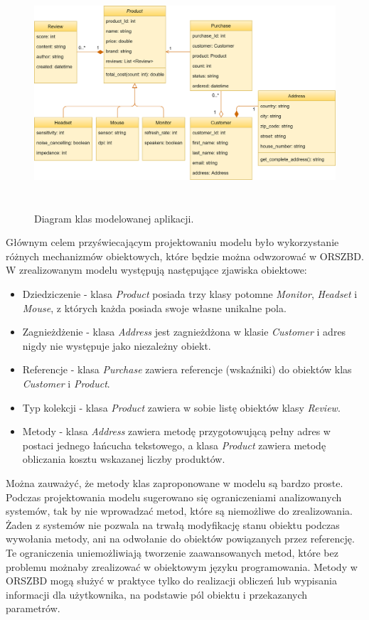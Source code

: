 \documentclass[a4paper,twoside,12pt]{book}
\begin{document}
\begin{figure}[!h]
    \centering
    \includegraphics[height=8.6cm]{images/d1.png}
    \caption{Diagram klas modelowanej aplikacji.}
    \label{fig:diagram-klas}
\end{figure}

Głównym celem przyświecającym projektowaniu modelu było wykorzystanie różnych mechanizmów obiektowych, które będzie można odwzorować w ORSZBD. W zrealizowanym modelu występują następujące zjawiska obiektowe:
\begin{itemize}
\item Dziedziczenie - klasa \textit{Product} posiada trzy klasy potomne \textit{Monitor}, \textit{Headset} i \textit{Mouse}, z których każda posiada swoje własne unikalne pola. 
\item Zagnieżdżenie - klasa \textit{Address} jest zagnieżdżona w klasie \textit{Customer} i adres nigdy nie występuje jako niezależny obiekt.
\item Referencje - klasa \textit{Purchase} zawiera referencje (wskaźniki) do obiektów klas \textit{Customer} i \textit{Product}.
\item Typ kolekcji - klasa \textit{Product} zawiera w sobie listę obiektów klasy \textit{Review}.
\item Metody - klasa \textit{Address} zawiera metodę przygotowującą pełny adres w postaci jednego łańcucha tekstowego, a klasa \textit{Product} zawiera metodę obliczania kosztu wskazanej liczby produktów.
\end{itemize}

Można zauważyć, że metody klas zaproponowane w modelu są bardzo proste. Podczas projektowania modelu sugerowano się ograniczeniami analizowanych systemów, tak by nie wprowadzać metod, które są niemożliwe do zrealizowania. Żaden z systemów nie pozwala na trwałą modyfikację stanu obiektu podczas wywołania metody, ani na odwołanie do obiektów powiązanych przez referencję. Te ograniczenia uniemożliwiają tworzenie zaawansowanych metod, które bez problemu możnaby zrealizować w obiektowym języku programowania. Metody w ORSZBD mogą służyć w praktyce tylko do realizacji obliczeń lub wypisania informacji dla użytkownika, na podstawie pól obiektu i przekazanych parametrów.
\end{document}
